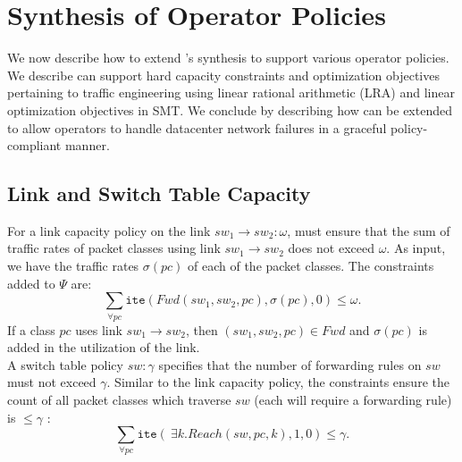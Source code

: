 \section{Synthesis of Operator Policies}
\label{sec:optimization}

We now describe how to extend \Name's synthesis to support various
operator policies.  We describe \Name can support
hard capacity constraints and
optimization objectives pertaining to traffic engineering using
 linear rational arithmetic (LRA) and linear
optimization objectives in SMT. We conclude by describing how \Name can be
extended to allow operators to handle datacenter network failures in a
graceful policy-compliant manner.

\subsection{Link and Switch Table Capacity} \label{sec:linkcap}
For a link capacity policy on the link $sw_1 \rightarrow sw_2: \omega$, 
\name must ensure that the sum of traffic rates of packet
classes using link $sw_1 \rightarrow sw_2$
does not exceed $\omega$. 
As input, we have the traffic rates $\sigma(pc)$ of
each of the packet classes. The constraints added to $\Psi$ are:
\begin{equation}
 \sum_{\forall pc} \texttt{ite}(Fwd(sw_1,sw_2, pc), \sigma(pc), 0) \leq \omega .
\end{equation}
If a class $pc$ uses link $sw_1 \rightarrow sw_2$, then $(sw_1,sw_2, pc) \in Fwd$
and $\sigma(pc)$ is added in the utilization of the link. \\
\noindent A switch table policy $sw : \gamma$ specifies that the number of forwarding 
rules on $sw$ must not exceed $\gamma$. Similar to the link capacity policy,
the constraints ensure the count of all packet classes which traverse $sw$ (each 
will require a forwarding rule) is $\leq \gamma$ :
\begin{equation}
\sum_{\forall pc} \texttt{ite}(~\exists k. Reach(sw,pc,k), 1, 0)  \leq \gamma.
\end{equation}





